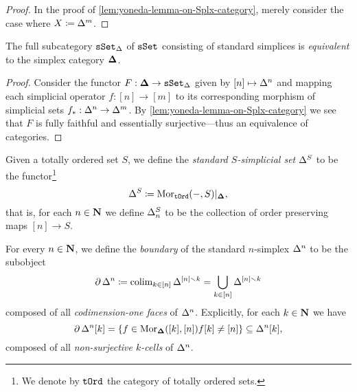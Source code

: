 \begin{proof}
    In the proof of \cref{lem:yoneda-lemma-on-Splx-category}, merely consider the
    case where \(X \coloneq \Delta^m\).
\end{proof}

\begin{corollary}
    \label{cor:standard-simplices-equivalent-Splx}
    The full subcategory \({\texttt{sSet}}_{\Delta}\) of \({\texttt{sSet}}\) consisting of standard
    simplices is \emph{equivalent} to the simplex category \({\mathbf{\Delta}}\).
\end{corollary}

\begin{proof}
    Consider the functor \(F: {\mathbf{\Delta}} \to {\texttt{sSet}}_{\Delta}\) given by
    \([n] \mapsto \Delta^n\) and mapping each simplicial operator \(f: [n] \to [m]\)
    to its corresponding morphism of simplicial sets \(f_{*}: \Delta^n \to
    \Delta^m\). By \cref{lem:yoneda-lemma-on-Splx-category} we see that \(F\) is
    fully faithful and essentially surjective---thus an equivalence of categories.
\end{proof}

\begin{definition}
    \label{def:standard-simplex-on-totally-ordered-set}
    Given a totally ordered set \(S\), we define the \emph{standard \(S\)-simplicial
        set} \(\Delta^S\) to be the functor\footnote{We denote by \({\texttt{tOrd}}\) the category
        of totally ordered sets.}
    \[
        \Delta^{S} \coloneq \operatorname{Mor}_{{\texttt{tOrd}}}(-, S)|_{{\mathbf{\Delta}}},
    \]
    that is, for each \(n \in \mathbf{N}\) we define \(\Delta^S_n\) to be the collection of
    order preserving maps \([n] \to S\).
\end{definition}

\begin{definition}
    \label{def:boundary-of-standard-simplex}
    For every \(n \in \mathbf{N}\), we define the \emph{boundary} of the standard
    \(n\)-simplex \(\Delta^n\) to be the subobject
    \[
        \operatorname{\partial} \Delta^n \coloneq \operatorname{colim}_{k \in [n]} \Delta^{[n] \smallsetminus k}
        = \bigcup_{k \in [n]} \Delta^{[n] \smallsetminus k}
    \]
    composed of all \emph{codimension-one faces} of \(\Delta^n\). Explicitly, for
    each \(k \in \mathbf{N}\) we have
    \[
        \operatorname{\partial} \Delta^n [k] = \{ f \in \operatorname{Mor}_{{\mathbf{\Delta}}}([k], [n]) \relax f[k] \neq [n] \}
        \subseteq \Delta^n[k],
    \]
    composed of all \emph{non-surjective \(k\)-cells} of \(\Delta^n\).
\end{definition}

